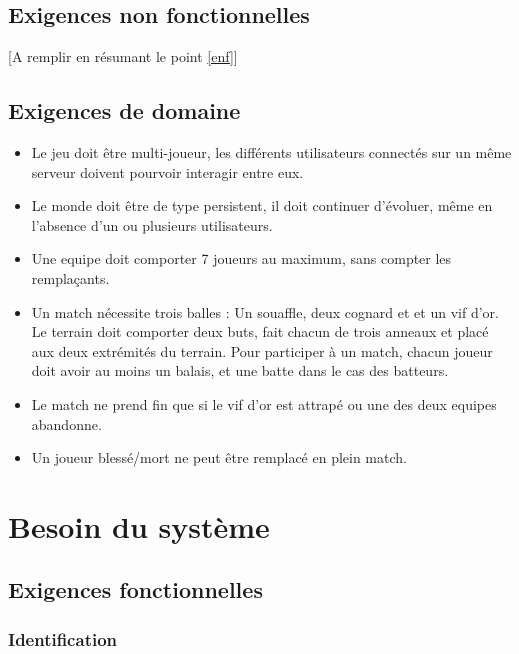 \documentclass[a4paper]{article}
\begin{document}

\subsection{Exigences non fonctionnelles}
[A remplir en résumant le point \ref{enf}]


\subsection{Exigences de domaine}
\begin{itemize}
\item Le jeu doit être multi-joueur, les différents \glspl{utilisateur} connectés sur un même \gls{serveur} doivent pourvoir interagir entre eux.
\item Le monde doit être de type persistent, il doit continuer d'évoluer, même en l'absence d'un ou plusieurs \glspl{utilisateur}.
\item Une \gls{equipe} doit comporter 7 \glspl{joueur} au maximum, sans compter les remplaçants.
\item Un match nécessite trois balles : Un souaffle, deux cognard et  et un vif d'or. Le terrain doit comporter deux buts, fait chacun de trois anneaux et placé aux deux extrémités du terrain. Pour participer à un match, chacun \gls{joueur} doit avoir au moins un balais, et une batte dans le cas des batteurs.
\item Le match ne prend fin que si le vif d'or est attrapé ou une des deux \glspl{equipe} abandonne.
\item Un \gls{joueur} blessé/mort ne peut être remplacé en plein match.
\end{itemize}


\section{Besoin du système}
\subsection{Exigences fonctionnelles}

\subsubsection{Identification}
\end{document}
